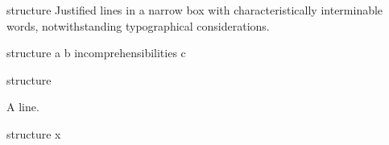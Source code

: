 \documentclass{beamer}
\begin{document}
\begin{frame}
\begin{beamercolorbox}[wd=2.6cm,rightskip=0pt]{structure}
Justified lines in a narrow box with characteristically interminable words, notwithstanding typographical considerations.
\end{beamercolorbox}

\begin{beamercolorbox}[wd=2cm,rightskip=0pt]{structure}
a b incomprehensibilities c
\end{beamercolorbox}

\begin{beamercolorbox}[wd=3cm]{structure}
\end{beamercolorbox}
A line.

\begin{beamercolorbox}[wd=3cm,ht=4pt,dp=1pt]{structure}
x
\end{beamercolorbox}
\end{frame}
\end{document}
